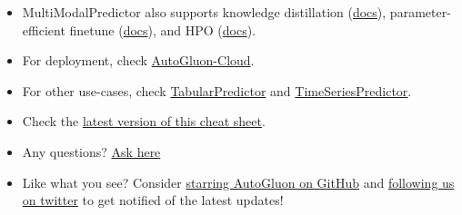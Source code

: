 \begin{itemize}
  \item MultiModalPredictor also supports knowledge distillation (\href{https://auto.gluon.ai/stable/tutorials/multimodal/advanced_topics/model_distillation.html}{docs}), parameter-efficient finetune (\href{https://auto.gluon.ai/stable/tutorials/multimodal/advanced_topics/efficient_finetuning_basic.html}{docs}), and HPO (\href{https://auto.gluon.ai/stable/tutorials/multimodal/advanced_topics/hyperparameter_optimization.html}{docs}).
  \item For deployment, check \href{https://auto.gluon.ai/stable/tutorials/cloud_fit_deploy/index.html}{AutoGluon-Cloud}.
  \item For other use-cases, check
  \href{https://auto.gluon.ai/stable/tutorials/tabular_prediction/index.html}{TabularPredictor} and
  \href{https://auto.gluon.ai/stable/tutorials/timeseries/index.html}{TimeSeriesPredictor}.
  \item Check the \href{https://auto.gluon.ai/stable/cheatsheet.html}{latest version of this cheat sheet}.
  \item Any questions? \href{https://github.com/awslabs/autogluon/discussions}{Ask here}
  \item Like what you see? Consider \href{https://github.com/awslabs/autogluon/stargazers}{starring AutoGluon on GitHub} and \href{https://twitter.com/autogluon}{following us on twitter} to get notified of the latest updates!
\end{itemize}


\raggedcolumns


